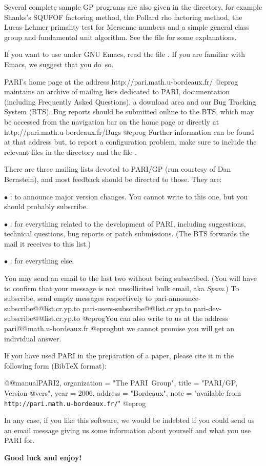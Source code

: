  Several complete sample GP programs are also given in
the  directory, for example Shanks's SQUFOF factoring method,
the Pollard rho factoring method, the Lucas-Lehmer primality test for
Mersenne numbers and a simple general class group and fundamental unit
algorithm. See the file  for some explanations.

 If you want to use  under GNU Emacs, read the file
. If you are familiar with Emacs, we suggest that
you do~so.

 PARI's home page at the address
\bprog
  http://pari.math.u-bordeaux.fr/
@eprog\noindent
maintains an archive of mailing lists dedicated to PARI, documentation
(including Frequently Asked Questions), a download area and our Bug Tracking
System (BTS). Bug reports should be submitted online to the BTS, which may be
accessed from the navigation bar on the home page or directly at
\bprog
  http://pari.math.u-bordeaux.fr/Bugs
@eprog\noindent
Further information can be found at that address but, to report a
configuration problem, make sure to include the relevant  files in
the  directory and the file .
\smallskip

There are three mailing lists devoted to PARI/GP (run courtesy of Dan
Bernstein), and most feedback should be directed to those. They are:

$\bullet$ : to announce major version changes.
You cannot write to this one, but you should probably subscribe.

$\bullet$ : for everything related to the development
of PARI, including suggestions, technical questions, bug reports or patch
submissions. (The BTS forwards the mail it receives to this list.)

 $\bullet$ : for everything else.

\noindent You may send an email to the last two without being subscribed.
(You will have to confirm that your message is not unsollicited bulk email,
aka \emph{Spam}.) To subscribe, send empty messages respectively to
\def\@{@}
\bprog
  pari-announce-subscribe@@list.cr.yp.to
     pari-users-subscribe@@list.cr.yp.to
       pari-dev-subscribe@@list.cr.yp.to
@eprog\noindent You can also write to us at the address
\bprog
  pari@@math.u-bordeaux.fr
@eprog\noindent but we cannot promise you will get an individual answer.
\smallskip

If you have used PARI in the preparation of a paper, please cite it in the
following form (BibTeX format):

\bprog
@@manual{PARI2,
    organization = "{The PARI~Group}",
    title        = "{PARI/GP, Version @vers}",
    year         = 2006,
    address      = "Bordeaux",
    note         = "available from {\tt http://pari.math.u-bordeaux.fr/}"
}
@eprog
\smallskip

\noindent In any case, if you like this software, we would be indebted if you
could send us an email message giving us some information about yourself and
what you use PARI for.

\medskip
{\bf Good luck and enjoy!}
\vfill\eject
